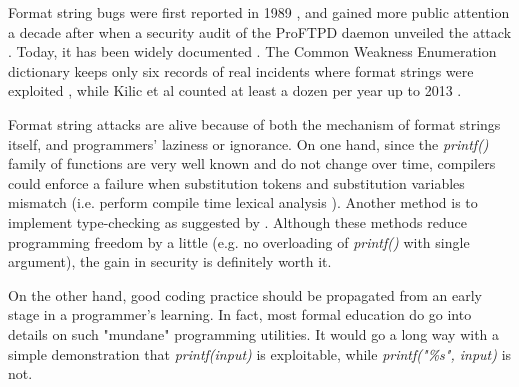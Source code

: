 
Format string bugs were first reported in 1989 \cite{Miller1990}, and gained more public attention a decade after when a security audit of the ProFTPD daemon unveiled the attack \cite{tymm1999}. Today, it has been widely documented \cite{fsa_owasp, Weitz2014, Shankar2001, cowan2002, arbaugh1997automated, scut2001}. The Common Weakness Enumeration dictionary keeps only six records of real incidents where format strings were exploited \cite{fsa_cwe}, while Kilic et al counted at least a dozen per year up to 2013 \cite{Kilic2015}.

Format string attacks are alive because of both the mechanism of format strings itself, and programmers' laziness or ignorance. On one hand, since the \emph{printf()} family of functions are very well known and do not change over time, compilers could enforce a failure when substitution tokens and substitution variables mismatch (i.e. perform compile time lexical analysis \cite{alanpscan}). Another method is to implement type-checking as suggested by \cite{Weitz2014}. Although these methods reduce programming freedom by a little (e.g. no overloading of \emph{printf()} with single argument), the gain in security is definitely worth it.

On the other hand, good coding practice should be propagated from an early stage in a programmer's learning. In fact, most formal education do go into details on such "mundane" programming utilities. It would go a long way with a simple demonstration that \emph{printf(input)} is exploitable, while \emph{printf("\%s", input)} is not.


